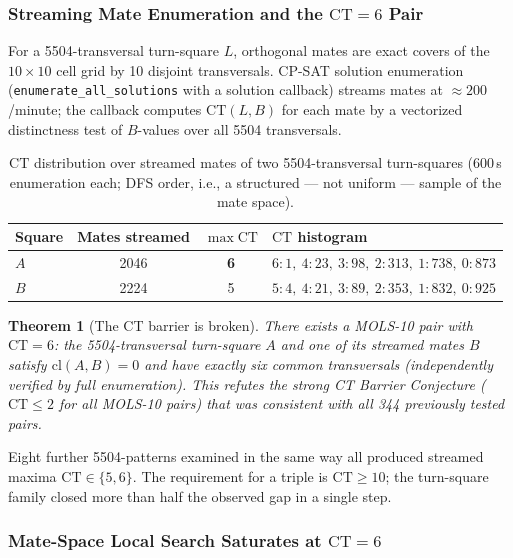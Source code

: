 \documentclass[11pt,a4paper]{article}
\newtheorem{theorem}{Theorem}[section]
\theoremstyle{remark}
\newcommand{\CT}{\mathrm{CT}}
\newcommand{\cl}{\mathrm{cl}}
\begin{document}
\subsubsection{Streaming Mate Enumeration and the $\CT=6$ Pair}

For a 5504-transversal turn-square $L$, orthogonal mates are exact covers of
the $10\times10$ cell grid by 10 disjoint transversals. CP-SAT solution
enumeration (\texttt{enumerate\_all\_solutions} with a solution callback)
streams mates at $\approx 200$/minute; the callback computes $\CT(L,B)$ for
each mate by a vectorized distinctness test of $B$-values over all 5504
transversals.

\begin{table}[h]
\centering
\caption{$\CT$ distribution over streamed mates of two 5504-transversal
turn-squares (600\,s enumeration each; DFS order, i.e., a structured ---
not uniform --- sample of the mate space).}\label{tab:cthist}
\begin{tabular}{lccl}
\toprule
Square & Mates streamed & $\max \CT$ & $\CT$ histogram\\
\midrule
$A$ & 2046 & \textbf{6} & $6{:}1,\ 4{:}23,\ 3{:}98,\ 2{:}313,\ 1{:}738,\ 0{:}873$\\
$B$ & 2224 & 5 & $5{:}4,\ 4{:}21,\ 3{:}89,\ 2{:}353,\ 1{:}832,\ 0{:}925$\\
\bottomrule
\end{tabular}
\end{table}

\begin{theorem}[The CT barrier is broken]\label{thm:ct6}
There exists a MOLS-10 pair with $\CT = 6$: the 5504-transversal turn-square
$A$ and one of its streamed mates $B$ satisfy $\cl(A,B)=0$ and have exactly
six common transversals (independently verified by full enumeration).
This refutes the strong CT Barrier Conjecture ($\CT \leq 2$ for all MOLS-10
pairs) that was consistent with all 344 previously tested pairs.
\end{theorem}

Eight further 5504-patterns examined in the same way all produced streamed
maxima $\CT \in \{5, 6\}$. The requirement for a triple is $\CT \geq 10$; the
turn-square family closed more than half the observed gap in a single step.

\subsubsection{Mate-Space Local Search Saturates at $\CT = 6$}
\end{document}
